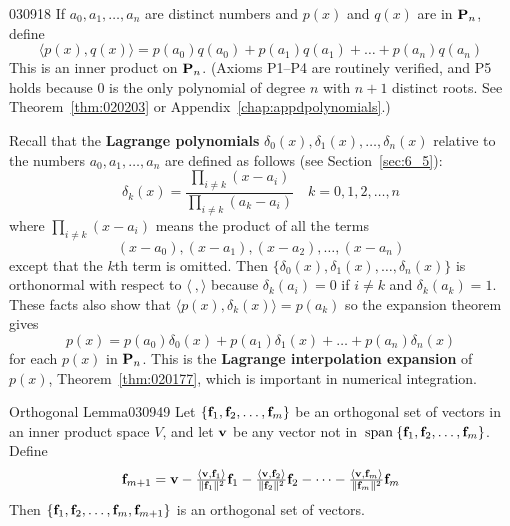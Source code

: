 \begin{example}{}{030918}
If $a_{0}, a_{1}, \dots, a_{n}$ are distinct numbers and $p(x)$ and $q(x)$ are in $\textbf{P}_{n}$, define
\begin{equation*}
\langle p(x), q(x) \rangle = p(a_0)q(a_0) + p(a_1)q(a_1) + \dots + p(a_n)q(a_n)
\end{equation*}
This is an inner product on $\textbf{P}_{n}$. (Axioms P1--P4 are routinely verified, and P5 holds because $0$ is the only polynomial of degree $n$ with $n + 1$ distinct roots. See Theorem~\ref{thm:020203} or Appendix~\ref{chap:appdpolynomials}.)

Recall that the \textbf{Lagrange polynomials} $\delta_{0}(x), \delta_{1}(x), \dots, \delta_{n}(x)$ relative to the numbers $a_{0}, a_{1}, \dots, a_{n}$ are defined as follows (see Section~\ref{sec:6_5}):
\begin{equation*}
\delta_k(x) = \frac{\prod_{i \neq k}(x - a_i)}{\prod_{i \neq k}(a_k - a_i)}\quad
k = 0, 1, 2, \dots, n
\end{equation*}
where $\prod_{i \neq k}(x - a_i)$ means the product of all the terms
\begin{equation*}
(x - a_0), (x - a_1), (x - a_2), \dots, (x - a_n)
\end{equation*}
except that the $k$th term is omitted. Then $\{\delta_{0}(x), \delta_{1}(x), \dots, \delta_{n}(x)\}$ is orthonormal with respect to $\langle\ , \rangle$ because $\delta_{k}(a_{i}) = 0$ if $i \neq k$ and $\delta_{k}(a_{k}) = 1$. These facts also show that $\langle p(x), \delta_{k}(x)\rangle = p(a_{k})$ so the expansion theorem gives
\begin{equation*}
p(x) = p(a_0)\delta_0(x) + p(a_1)\delta_1(x) + \dots + p(a_n)\delta_n(x)
\end{equation*}
for each $p(x)$ in $\textbf{P}_{n}$. This is the \textbf{Lagrange interpolation expansion} of $p(x)$, Theorem~\ref{thm:020177}, which is important in numerical integration.
\end{example}

\begin{lemma}{Orthogonal Lemma}{030949}
Let $\{\textbf{f}_{1}, \textbf{f}_{2}, \dots, \textbf{f}_{m}\}$ be an orthogonal set of vectors in an inner product space $V$, and let $\textbf{v}$ be any vector not in $\thinspace\operatorname{span\medspace}\{\textbf{f}_{1}, \textbf{f}_{2}, \dots, \textbf{f}_{m}\}$. Define
\begin{equation*}
\textbf{f}_{m + 1} = \textbf{v} -
\tfrac{\langle \textbf{v}, \textbf{f}_1 \rangle}{\| \textbf{f}_1 \| ^2} \textbf{f}_1 - 
\tfrac{\langle \textbf{v}, \textbf{f}_2 \rangle}{\| \textbf{f}_2 \| ^2} \textbf{f}_2 - \dots -
\tfrac{\langle \textbf{v}, \textbf{f}_m \rangle}{\| \textbf{f}_m \| ^2} \textbf{f}_m
\end{equation*}
Then $\{\textbf{f}_{1}, \textbf{f}_{2}, \dots, \textbf{f}_{m}, \textbf{f}_{m+1}\}$ is an orthogonal set of vectors.
\end{lemma}

